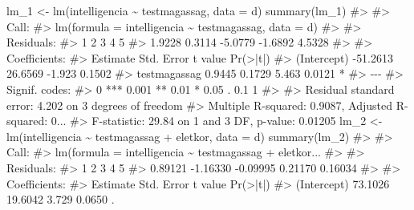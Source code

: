 \documentclass[
  letterpaper,
]{krantz}
\makeatletter
\newenvironment{Shaded}{\begin{snugshade}}{\end{snugshade}}
\newcommand{\AttributeTok}[1]{\textcolor[rgb]{0.40,0.45,0.13}{#1}}
\newcommand{\CommentTok}[1]{\textcolor[rgb]{0.37,0.37,0.37}{#1}}
\newcommand{\FunctionTok}[1]{\textcolor[rgb]{0.28,0.35,0.67}{#1}}
\newcommand{\NormalTok}[1]{\textcolor[rgb]{0.00,0.23,0.31}{#1}}
\newcommand{\OtherTok}[1]{\textcolor[rgb]{0.00,0.23,0.31}{#1}}
\newcommand{\SpecialCharTok}[1]{\textcolor[rgb]{0.37,0.37,0.37}{#1}}
\newenvironment{kframe}{%
\medskip{}
\setlength{\fboxsep}{.8em}
 \def\at@end@of@kframe{}%
 \ifinner\ifhmode%
  \def\at@end@of@kframe{\end{minipage}}%
  \begin{minipage}{\columnwidth}%
 \fi\fi%
 \def\FrameCommand##1{\hskip\@totalleftmargin \hskip-\fboxsep
 \colorbox{shadecolor}{##1}\hskip-\fboxsep
     \hskip-\linewidth \hskip-\@totalleftmargin \hskip\columnwidth}%
 \MakeFramed {\advance\hsize-\width
   \@totalleftmargin\z@ \linewidth\hsize
   \@setminipage}}%
 {\par\unskip\endMakeFramed%
 \at@end@of@kframe}
\renewenvironment{Shaded}{\begin{kframe}}{\end{kframe}}
\makeatother
\begin{document}
\begin{Shaded}
\begin{Highlighting}[]
\NormalTok{lm\_1 }\OtherTok{\textless{}{-}} \FunctionTok{lm}\NormalTok{(intelligencia }\SpecialCharTok{\textasciitilde{}}\NormalTok{ testmagassag, }\AttributeTok{data =}\NormalTok{ d)}
\FunctionTok{summary}\NormalTok{(lm\_1)}
\CommentTok{\#\textgreater{} }
\CommentTok{\#\textgreater{} Call:}
\CommentTok{\#\textgreater{} lm(formula = intelligencia \textasciitilde{} testmagassag, data = d)}
\CommentTok{\#\textgreater{} }
\CommentTok{\#\textgreater{} Residuals:}
\CommentTok{\#\textgreater{}       1       2       3       4       5 }
\CommentTok{\#\textgreater{}  1.9228  0.3114 {-}5.0779 {-}1.6892  4.5328 }
\CommentTok{\#\textgreater{} }
\CommentTok{\#\textgreater{} Coefficients:}
\CommentTok{\#\textgreater{}              Estimate Std. Error t value Pr(\textgreater{}|t|)  }
\CommentTok{\#\textgreater{} (Intercept)  {-}51.2613    26.6569  {-}1.923   0.1502  }
\CommentTok{\#\textgreater{} testmagassag   0.9445     0.1729   5.463   0.0121 *}
\CommentTok{\#\textgreater{} {-}{-}{-}}
\CommentTok{\#\textgreater{} Signif. codes:  }
\CommentTok{\#\textgreater{} 0 \textquotesingle{}***\textquotesingle{} 0.001 \textquotesingle{}**\textquotesingle{} 0.01 \textquotesingle{}*\textquotesingle{} 0.05 \textquotesingle{}.\textquotesingle{} 0.1 \textquotesingle{} \textquotesingle{} 1}
\CommentTok{\#\textgreater{} }
\CommentTok{\#\textgreater{} Residual standard error: 4.202 on 3 degrees of freedom}
\CommentTok{\#\textgreater{} Multiple R{-}squared:  0.9087, Adjusted R{-}squared:  0...}
\CommentTok{\#\textgreater{} F{-}statistic: 29.84 on 1 and 3 DF,  p{-}value: 0.01205}
\NormalTok{lm\_2 }\OtherTok{\textless{}{-}} \FunctionTok{lm}\NormalTok{(intelligencia }\SpecialCharTok{\textasciitilde{}}\NormalTok{ testmagassag }\SpecialCharTok{+}\NormalTok{ eletkor, }\AttributeTok{data =}\NormalTok{ d)}
\FunctionTok{summary}\NormalTok{(lm\_2)}
\CommentTok{\#\textgreater{} }
\CommentTok{\#\textgreater{} Call:}
\CommentTok{\#\textgreater{} lm(formula = intelligencia \textasciitilde{} testmagassag + eletkor...}
\CommentTok{\#\textgreater{} }
\CommentTok{\#\textgreater{} Residuals:}
\CommentTok{\#\textgreater{}        1        2        3        4        5 }
\CommentTok{\#\textgreater{}  0.89121 {-}1.16330 {-}0.09995  0.21170  0.16034 }
\CommentTok{\#\textgreater{} }
\CommentTok{\#\textgreater{} Coefficients:}
\CommentTok{\#\textgreater{}              Estimate Std. Error t value Pr(\textgreater{}|t|)  }
\CommentTok{\#\textgreater{} (Intercept)   73.1026    19.6042   3.729   0.0650 .}

\end{Highlighting}
\end{Shaded}
\end{document}
